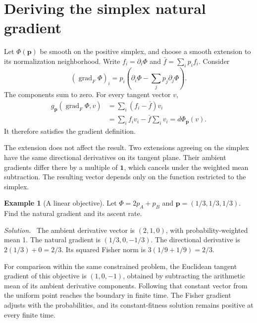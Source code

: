 \documentclass[11pt,oneside,openany]{book}
\theoremstyle{definition}
\newtheorem{example}{Example}[chapter]
\theoremstyle{remark}
\newenvironment{solution}{\par\smallskip\noindent\textit{Solution.}\ }{\par\smallskip}
\newcommand{\grad}{\operatorname{grad}}
\newcommand{\p}{\mathbf{p}}
\newcommand{\ones}{\mathbf{1}}
\numberwithin{equation}{chapter}
\begin{document}
\section{Deriving the simplex natural gradient}
Let $\Phi(\p)$ be smooth on the positive simplex, and choose a smooth extension to its normalization neighborhood. Write $f_i=\partial_i\Phi$ and $\bar f=\sum_i p_if_i$. Consider
\begin{equation}\label{eq:simplexnatural}
\boxed{(\grad_F\Phi)_i=p_i\left(\partial_i\Phi-\sum_jp_j\partial_j\Phi\right).}
\end{equation}
The components sum to zero. For every tangent vector $v$,
\begin{align*}
g_\p(\grad_F\Phi,v)
&=\sum_i(f_i-\bar f)v_i\\
&=\sum_if_iv_i-\bar f\sum_iv_i=d\Phi_\p(v).
\end{align*}
It therefore satisfies the gradient definition.

The extension does not affect the result. Two extensions agreeing on the simplex have the same directional derivatives on its tangent plane. Their ambient gradients differ there by a multiple of $\ones$, which cancels under the weighted mean subtraction. The resulting vector depends only on the function restricted to the simplex.

\begin{example}[A linear objective]
Let $\Phi=2p_A+p_B$ and $\p=(1/3,1/3,1/3)$. Find the natural gradient and its ascent rate.
\begin{solution}
The ambient derivative vector is $(2,1,0)$, with probability-weighted mean 1. The natural gradient is $(1/3,0,-1/3)$. The directional derivative is $2(1/3)+0=2/3$. Its squared Fisher norm is $3(1/9+1/9)=2/3$.
\end{solution}
\end{example}

For comparison within the same constrained problem, the Euclidean tangent gradient of this objective is $(1,0,-1)$, obtained by subtracting the arithmetic mean of its ambient derivative components. Following that constant vector from the uniform point reaches the boundary in finite time. The Fisher gradient adjusts with the probabilities, and its constant-fitness solution remains positive at every finite time.
\end{document}
